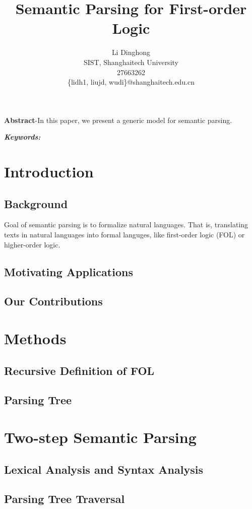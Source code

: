 \documentclass{article}
\title{Semantic Parsing for First-order Logic}
\author{
	Li Dinghong\\
	SIST, Shanghaitech University\\
	27663262\\
	\{lidh1, liujd, wudi\}@shanghaitech.edu.cn
}
\begin{document}
{
	\newpage
	\maketitle

	\textbf{Abstract}-{In this paper, we present a generic model for semantic parsing. }

	\vspace{5pt}
	\textbf{\emph{Keywords:}} {}

	\tableofcontents
}

\section{Introduction}{
	\subsection{Background}{
		Goal of semantic parsing is to formalize natural languages. That is, translating texts in natural languages into formal languges, like first-order logic (FOL) or higher-order logic. 
	}

	\subsection{Motivating Applications}{
		\cite{su} 
	}

	\subsection{Our Contributions}{}
}

\section{Methods}{
	\subsection{Recursive Definition of FOL}{}

	\subsection{Parsing Tree}{}
}

\section{Two-step Semantic Parsing}{
	\subsection{Lexical Analysis and Syntax Analysis}{}

	\subsection{Parsing Tree Traversal}{}
}
\end{document}
